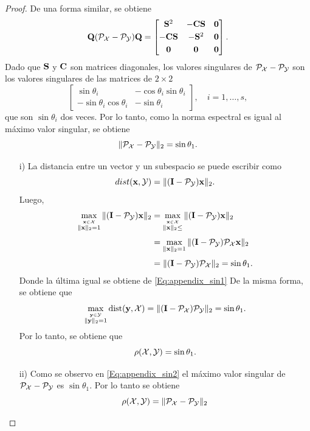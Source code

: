 \begin{proof}
            De una forma similar, se obtiene
             \[\mathbf{Q}(\mathcal{P}_{\mathcal{X}} - \mathcal{P}_{\mathcal{Y}})\mathbf{Q}  =  \begin{bmatrix} \mathbf{S}^2 & -\mathbf{C}\mathbf{S} & \mathbf{0}\\[0.3em] -\mathbf{C}\mathbf{S} & -\mathbf{S}^2 & \mathbf{0}\\[0.3em] \mathbf{0} & \mathbf{0} & \mathbf{0}
            \end{bmatrix}.\]
             Dado que $\mathbf{S}$ y $\mathbf{C}$ son matrices diagonales, los valores singulares de $\mathcal{P}_{\mathcal{X}}-\mathcal{P}_{\mathcal{Y}}$ son los valores singulares de las matrices de $2\times 2$
            \[\begin{bmatrix} \sin\theta_i & -\cos\theta_i\sin\theta_i\\[0.3em] -\sin\theta_i\cos\theta_i & -\sin\theta_i\end{bmatrix}, \quad i = 1,\ldots, s,\]
            que son $\sin\theta_i$ dos veces. Por lo tanto, como la norma espectral es igual al máximo valor singular, se obtiene
            \begin{equation} \|\mathcal{P}_{\mathcal{X}} - \mathcal{P}_{\mathcal{Y}}\|_2 = \sin\theta_1.\label{Eq:appendix_sin2}\end{equation}

            
		\begin{itemize}
		    \item[i)] La distancia entre un vector y un subespacio se puede escribir como
                    \[dist(\mathbf{x},\mathcal{Y}) = \|(\mathbf{I} -\mathcal{P}_{\mathcal{Y}})\mathbf{x}\|_2.\]
                    Luego,
                    \[\begin{aligned} \max_{\stackrel{\mathbf{x}\in\mathcal{X}}{\|\mathbf{x}\|_2=1}} \|(\mathbf{I} -\mathcal{P}_{\mathcal{Y}})\mathbf{x}\|_2 & = \max_{\stackrel{\mathbf{x}\in\mathcal{X}}{\|\mathbf{x}\|_2\le }} \|(\mathbf{I} -\mathcal{P}_{\mathcal{Y}})\mathbf{x}\|_2\\[0.3em]
                    & = \max_{\|\mathbf{x}\|_2=1}\|(\mathbf{I}-\mathcal{P}_{\mathcal{Y}})\mathcal{P}_{\mathcal{X}}\mathbf{x}\|_2 \\[0.3em]
                    & = \|(\mathbf{I}-\mathcal{P}_{\mathcal{Y}})\mathcal{P}_{\mathcal{X}}\|_2 = \sin\theta_1.
                    \end{aligned}\]
                    Donde la última igual se obtiene de \eqref{Eq:appendix_sin1}
                    De la misma forma, se obtiene que 
                    \[\max_{\stackrel{\mathbf{y}\in\mathcal{Y}}{\|\mathbf{y}\|_2=1}}\mathrm{dist}(\mathbf{y},\mathcal{X}) = \|(\mathbf{I}-\mathcal{P}_{\mathcal{X}})\mathcal{P}_{\mathcal{Y}}\|_2 = \sin\theta_1.\]
                Por lo tanto, se obtiene que 
                \[\rho(\mathcal{X},\mathcal{Y}) = \sin\theta_1.\]
                
            \item[ii)] Como se observo en \eqref{Eq:appendix_sin2} el máximo valor singular de $\mathcal{P}_{\mathcal{X}}-\mathcal{P}_{\mathcal{Y}}$ es $\sin\theta_1$. Por lo tanto se obtiene
            \[\rho(\mathcal{X},\mathcal{Y}) = \|\mathcal{P}_{\mathcal{X}}-\mathcal{P}_{\mathcal{Y}}\|_2\]
            
		\end{itemize}
	\end{proof}
	


